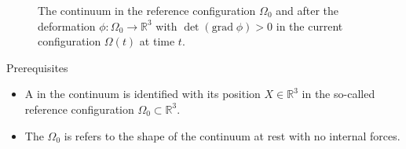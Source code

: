 \documentclass[\classoption]{beamer}
\newcommand{\R}{\mathbb{R}}
\begin{document}
\begin{frame}{}

\begin{figure}[!htbp]
\caption[The continuum in the reference configuration $\Omega_0$ and after the deformation $\phi : \Omega_0 \rightarrow \R^3$ in the current configuration $\Omega(t)$ at time $t$.]{The continuum in the reference configuration $\Omega_0$ and after the deformation $\phi : \Omega_0 \rightarrow \R^3$ with $\det(\text{grad}\;\phi) > 0$ in the current configuration $\Omega(t)$ at time $t$.}
\label{fig::chapter2:01}
\end{figure}

\begin{block}{Prerequisites}
\begin{itemize}
\item  A  in the continuum is identified with its position $X \in \R^3$ in the so-called reference configuration $\Omega_0 \subset \R^3$.
\item The  $\Omega_0$ is refers to the shape of the continuum at rest with no internal forces. 
\end{itemize}

\end{block}

\end{frame}
\end{document}
